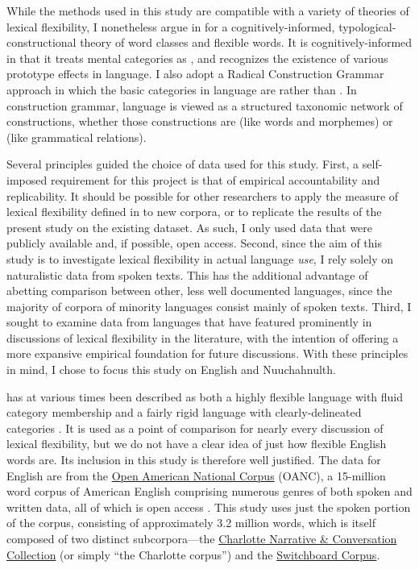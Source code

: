 While the methods used in this study are compatible with a variety of theories of lexical flexibility, I nonetheless argue in  for a cognitively-informed, typological-constructional theory of word classes and flexible words. It is cognitively-informed in that it treats mental categories as , and recognizes the existence of various prototype effects in language. I also adopt a Radical Construction Grammar approach \parencite{Croft2001b} in which the basic categories in language are  rather than  . In construction grammar, language is viewed as a structured taxonomic network of constructions, whether those constructions are  (like words and morphemes) or  (like grammatical relations).

Several principles guided the choice of data used for this study. First, a self-imposed requirement for this project is that of empirical accountability and replicability. It should be possible for other researchers to apply the measure of lexical flexibility defined in  to new corpora, or to replicate the results of the present study on the existing dataset. As such, I only used data that were publicly available and, if possible, open access. Second, since the aim of this study is to investigate lexical flexibility in actual language \emph{use}, I rely solely on naturalistic data from spoken texts. This has the additional advantage of abetting comparison between other, less well documented languages, since the majority of corpora of minority languages consist mainly of spoken texts. Third, I sought to examine data from languages that have featured prominently in discussions of lexical flexibility in the literature, with the intention of offering a more expansive empirical foundation for future discussions. With these principles in mind, I chose to focus this study on English and Nuuchahnulth.

 has at various times been described as both a highly flexible language with fluid category membership \parencites[47--48]{Crystal1967}{Vonen1994}[111]{Farrell2001}{Cannon1985} and a fairly rigid language with clearly-delineated categories \parencites[710]{Rijkhoff2007}[4, 11, 12]{SchachterShopen2007}[122, 126]{Velupillai2012}. It is used as a point of comparison for nearly every discussion of lexical flexibility, but we do not have a clear idea of just how flexible English words are. Its inclusion in this study is therefore well justified. The data for English are from the \href{http://www.anc.org/}{Open American National Corpus} (OANC), a 15-million word corpus of American English comprising numerous genres of both spoken and written data, all of which is open access \parencite{OANC}. This study uses just the spoken portion of the corpus, consisting of approximately 3.2 million words, which is itself composed of two distinct subcorpora—the \href{https://newsouthvoices.uncc.edu}{Charlotte Narrative \& Conversation Collection} (or simply \enquote{the Charlotte corpus}) and the \href{https://catalog.ldc.upenn.edu/LDC97S62}{Switchboard Corpus}.

